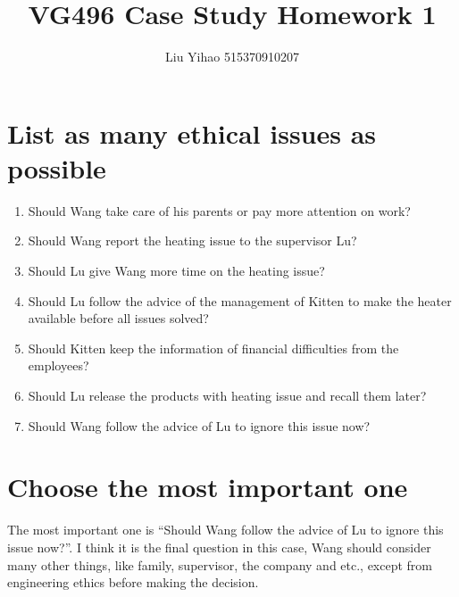\documentclass{article}
\title{VG496 Case Study Homework 1}
\author{Liu Yihao 515370910207}
\date{}
\begin{document}
\maketitle

\section{List as many ethical issues as possible}

\begin{enumerate}
\item Should Wang take care of his parents or pay more attention on work?
\item Should Wang report the heating issue to the supervisor Lu?
\item Should Lu give Wang more time on the heating issue?
\item Should Lu follow the advice of the management of Kitten to make the heater available before all issues solved?
\item Should Kitten keep the information of financial difficulties from the employees?
\item Should Lu release the products with heating issue and recall them later?
\item Should Wang follow the advice of Lu to ignore this issue now?
\end{enumerate}

\section{Choose the most important one}

The most important one is ``Should Wang follow the advice of Lu to ignore this issue now?''. I think it is the final question in this case, Wang should consider many other things, like family, supervisor, the company and etc., except from engineering ethics before making the decision.
\end{document}
